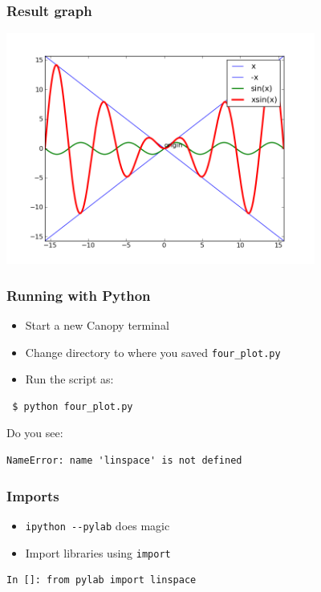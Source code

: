 \documentclass[14pt,compress]{beamer}
\newcounter{time}
\newcommand{\inctime}[1]{\addtocounter{time}{#1}{\tiny \thetime\ m}}
\newcommand{\typ}[1]{\lstinline{#1}}
\begin{document}
\begin{frame}[fragile]
  \frametitle{Result graph}
  \begin{center}
    \includegraphics[height=3in, interpolate=true]{data/four_plot}
  \end{center}
\end{frame}

\begin{frame}[fragile]
  \frametitle{Running with Python}
  \begin{itemize}
  \item Start a new Canopy terminal
  \item Change directory to where you saved \typ{four_plot.py}
  \item Run the script as:
  \end{itemize}
\begin{lstlisting}
 $ python four_plot.py
\end{lstlisting}
  \pause
  Do you see:
  \begin{small}
\begin{lstlisting}
NameError: name 'linspace' is not defined
\end{lstlisting}
  \end{small}
\end{frame}

\begin{frame}[fragile]
  \frametitle{Imports}
  \begin{itemize}
  \item \typ{ipython --pylab} does magic
  \item Import libraries using \typ{import}
  \end{itemize}
\begin{lstlisting}
In []: from pylab import linspace
\end{lstlisting}
\inctime{5}
\end{frame}
\end{document}
